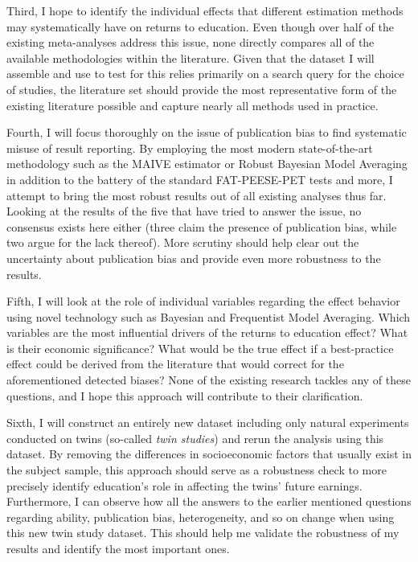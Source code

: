 Third, I hope to identify the individual effects that different estimation methods may systematically have on returns to education. Even though over half of the existing meta-analyses address this issue, none directly compares all of the available methodologies within the literature. Given that the dataset I will assemble and use to test for this relies primarily on a search query for the choice of studies, the literature set should provide the most representative form of the existing literature possible and capture nearly all methods used in practice.

Fourth, I will focus thoroughly on the issue of publication bias to find systematic misuse of result reporting. By employing the most modern state-of-the-art methodology such as the MAIVE estimator \citep{irsova2023maive} or Robust Bayesian Model Averaging \citep{maier2022robust} in addition to the battery of the standard FAT-PEESE-PET tests and more, I attempt to bring the most robust results out of all existing analyses thus far. Looking at the results of the five that have tried to answer the issue, no consensus exists here either (three claim the presence of publication bias, while two argue for the lack thereof). More scrutiny should help clear out the uncertainty about publication bias and provide even more robustness to the results.

Fifth, I will look at the role of individual variables regarding the effect behavior using novel technology such as Bayesian and Frequentist Model Averaging. Which variables are the most influential drivers of the returns to education effect? What is their economic significance? What would be the true effect if a best-practice effect could be derived from the literature that would correct for the aforementioned detected biases? None of the existing research tackles any of these questions, and I hope this approach will contribute to their clarification.

Sixth, I will construct an entirely new dataset including only natural experiments conducted on twins (so-called \textit{twin studies}) and rerun the analysis using this dataset. By removing the differences in socioeconomic factors that usually exist in the subject sample, this approach should serve as a robustness check to more precisely identify education's role in affecting the twins' future earnings. Furthermore, I can observe how all the answers to the earlier mentioned questions regarding ability, publication bias, heterogeneity, and so on change when using this new twin study dataset. This should help me validate the robustness of my results and identify the most important ones.

